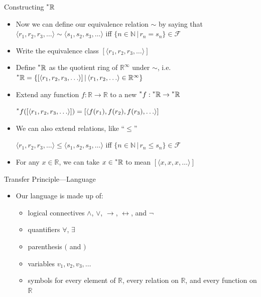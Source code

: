\documentclass{beamer}
\theoremstyle{plain}
\theoremstyle{definition}
\newcommand{\sthat}{\,|\,}
\newcommand{\reals}{\mathbb{R}}
\newcommand{\hreals}{\prescript{*}{}{\mathbb{R}}}
\newcommand{\nats}{\mathbb{N}}
\newcommand{\hr}[1]{\prescript{*}{}{#1}}
\begin{document}
\begin{frame}{Constructing $\hreals$}
\begin{itemize}
\setlength{\itemsep}{8pt}

\item Now we can define our equivalence relation $\sim$ by saying that $\langle r_1, r_2, r_3, \ldots \rangle \sim \langle s_1, s_2, s_3, \ldots \rangle$ iff $\{n \in \nats \sthat r_n = s_n \} \in \mathcal{F}$ 

\item Write the equivalence class $[\langle r_1, r_2, r_3, \ldots \rangle]$

\item Define $\hreals$ as the quotient ring of $\reals^\infty$ under $\sim$, i.e. $\hreals = \{[\langle r_1, r_2, r_3, \ldots \rangle] \sthat \langle r_1, r_2, \ldots \rangle \in \reals^\infty\}$

\item Extend any function $f: \reals \to \reals$ to a new $\hr{f}: \hreals \to \hreals$

$\hr{f}([\langle r_1, r_2, r_3, \ldots \rangle]) = [\langle f(r_1), f(r_2), f(r_3), \ldots \rangle]$

\item We can also extend relations, like ``$\leq$'' 

$\langle r_1, r_2, r_3, \ldots \rangle \leq \langle s_1, s_2, s_3, \ldots \rangle$ iff $\{n \in \nats \sthat r_n \leq s_n\} \in \mathcal{F}$

\item For any $x \in \reals$, we can take $x \in \hreals$ to mean $[\langle x, x, x, \ldots \rangle]$
\end{itemize}
\end{frame}

\begin{frame}{Transfer Principle---Language}
\begin{itemize}
\item Our language is made up of:
	\begin{itemize}
	\item logical connectives $\land$, $\lor$, $\to$, $\leftrightarrow$, and $\neg$
	\item quantifiers $\forall$, $\exists$
	\item parenthesis $($ and $)$
	\item variables $v_1, v_2, v_3, \ldots$
	\item symbols for every element of $\reals$, every relation on $\reals$, and every function on $\reals$
	\end{itemize}
\end{itemize}
\end{frame}
\end{document}
